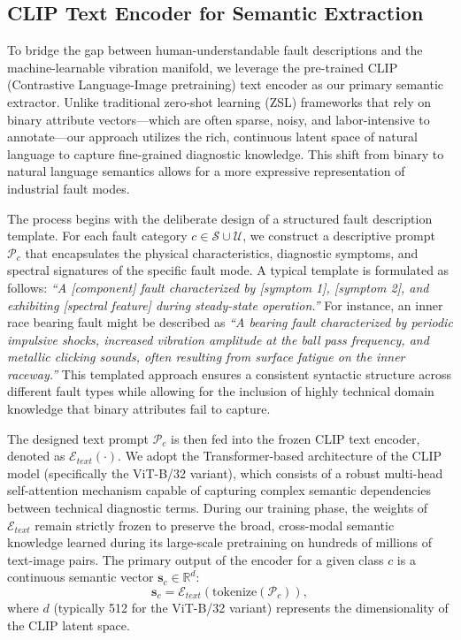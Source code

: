 \subsection{CLIP Text Encoder for Semantic Extraction}
\label{sec:method_clip_text_encoder}

To bridge the gap between human-understandable fault descriptions and the machine-learnable vibration manifold, we leverage the pre-trained CLIP (Contrastive Language-Image pretraining) text encoder as our primary semantic extractor. Unlike traditional zero-shot learning (ZSL) frameworks that rely on binary attribute vectors—which are often sparse, noisy, and labor-intensive to annotate—our approach utilizes the rich, continuous latent space of natural language to capture fine-grained diagnostic knowledge. This shift from binary to natural language semantics allows for a more expressive representation of industrial fault modes.

The process begins with the deliberate design of a structured fault description template. For each fault category $c \in \mathcal{S} \cup \mathcal{U}$, we construct a descriptive prompt $\mathcal{P}_c$ that encapsulates the physical characteristics, diagnostic symptoms, and spectral signatures of the specific fault mode. A typical template is formulated as follows: \textit{``A [component] fault characterized by [symptom 1], [symptom 2], and exhibiting [spectral feature] during steady-state operation.''} For instance, an inner race bearing fault might be described as \textit{``A bearing fault characterized by periodic impulsive shocks, increased vibration amplitude at the ball pass frequency, and metallic clicking sounds, often resulting from surface fatigue on the inner raceway.''} This templated approach ensures a consistent syntactic structure across different fault types while allowing for the inclusion of highly technical domain knowledge that binary attributes fail to capture.

The designed text prompt $\mathcal{P}_c$ is then fed into the frozen CLIP text encoder, denoted as $\mathcal{E}_{text}(\cdot)$. We adopt the Transformer-based architecture of the CLIP model (specifically the ViT-B/32 variant), which consists of a robust multi-head self-attention mechanism capable of capturing complex semantic dependencies between technical diagnostic terms. During our training phase, the weights of $\mathcal{E}_{text}$ remain strictly frozen to preserve the broad, cross-modal semantic knowledge learned during its large-scale pretraining on hundreds of millions of text-image pairs. The primary output of the encoder for a given class $c$ is a continuous semantic vector $\mathbf{s}_c \in \mathbb{R}^d$:
\begin{equation}
    \mathbf{s}_c = \mathcal{E}_{text}(\text{tokenize}(\mathcal{P}_c)),
\end{equation}
where $d$ (typically 512 for the ViT-B/32 variant) represents the dimensionality of the CLIP latent space.

